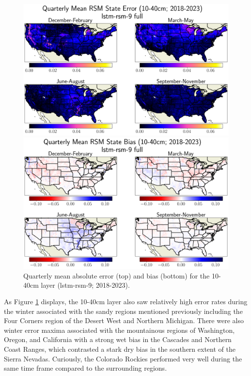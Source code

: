 \begin{figure}[hp!]
    \centering

    \includegraphics[width=.99\linewidth,draft=false]{figures/grid-eval_qtrly/eval-grid_full_lstm-rsm-9_pixelwise-time-stats_abs-err_qtrly-err-state-rsm-40.png}


    \includegraphics[width=.99\linewidth,draft=false]{figures/grid-eval_qtrly/eval-grid_full_lstm-rsm-9_pixelwise-time-stats_bias_qtrly-err-state-rsm-40.png}

    \caption{Quarterly mean absolute error (top) and bias (bottom) for the 10-40cm layer (lstm-rsm-9; 2018-2023).}
    \label{bulk-eval_qtrly_rsm-40}
\end{figure}

As Figure \ref{bulk-eval_qtrly_rsm-40} displays, the 10-40cm layer also saw relatively high error rates during the winter associated with the sandy regions mentioned previously including the Four Corners region of the Desert West and Northern Michigan. There were also winter error maxima associated with the mountainous regions of Washington, Oregon, and California with a strong wet bias in the Cascades and Northern Coast Ranges, which contrasted a stark dry bias in the southern extent of the Sierra Nevadas. Curiously, the Colorado Rockies performed very well during the same time frame compared to the surrounding regions.

